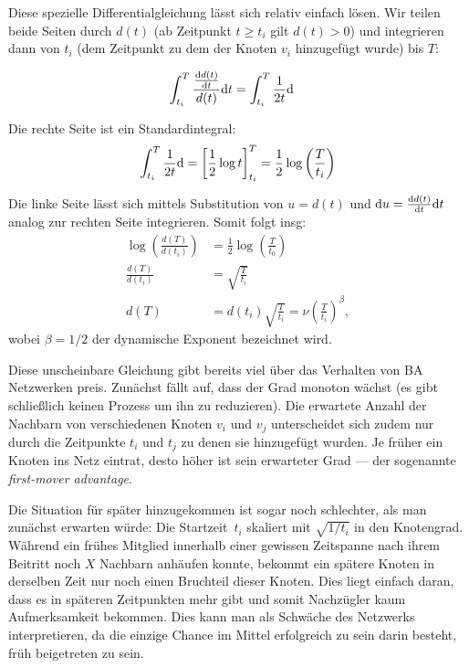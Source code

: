 Diese spezielle Differentialgleichung lässt sich relativ einfach lösen.
Wir teilen beide Seiten durch $d(t)$ (ab Zeitpunkt $t \ge t_i$ gilt $d(t) > 0$) und integrieren dann von $t_i$ (dem Zeitpunkt zu dem der Knoten $v_i$ hinzugefügt wurde) bis $T$:

\begin{align}
    \int_{t_i}^T  \frac{\frac{\text d d(t)}{\text d t}}{d(t)} \text d t & = \int_{t_i}^T \frac{1}{2t} \text d
\end{align}

\noindent
Die rechte Seite ist ein Standardintegral:
\begin{align}
    \int_{t_i}^T \frac{1}{2t} \text d = \left[ \frac 1 2 \log t \right]_{t_i}^T = \frac 1 2 \log\left(\frac{T}{t_i}\right)
\end{align}

Die linke Seite lässt sich mittels Substitution von $u = d(t)$ und $\text d u = \frac{\text d d(t)}{\text d t} \text d t$ analog zur rechten Seite integrieren.
Somit folgt insg:
\begin{align}
    \log\left(\frac{d(T)}{d(t_i)}\right) & = \frac 1 2 \log \left(\frac{T}{t_0}\right)                             \\
    \frac{d(T)}{d(t_i)}                  & = \sqrt{\frac{T}{t_i}}                                                  \\
    d(T)                                 & = d(t_i) \sqrt{\frac{T}{t_i}} = \nu \left( \frac{T}{t_i} \right)^\beta,
\end{align}
wobei $\beta = 1/2$ der  dynamische Exponent bezeichnet wird.

Diese unscheinbare Gleichung gibt bereits viel über das Verhalten von BA Netzwerken preis.
Zunächst fällt auf, dass der Grad monoton wächst (es gibt schließlich keinen Prozess um ihn zu reduzieren).
Die erwartete Anzahl der Nachbarn von verschiedenen Knoten $v_i$ und $v_j$ unterscheidet sich zudem nur durch die Zeitpunkte $t_i$ und $t_j$ zu denen sie hinzugefügt wurden.
Je früher ein Knoten ins Netz eintrat, desto höher ist sein erwarteter Grad --- der sogenannte  \emph{first-mover advantage}.

Die Situation für später hinzugekommen ist sogar noch schlechter, als man zunächst erwarten würde:
Die Startzeit~$t_i$ skaliert mit $\sqrt{1 / t_i}$ in den Knotengrad.
Während ein frühes Mitglied innerhalb einer gewissen Zeitspanne nach ihrem Beitritt noch $X$ Nachbarn anhäufen konnte, bekommt ein spätere Knoten in derselben Zeit nur noch einen Bruchteil dieser Knoten.
Dies liegt einfach daran, dass es in späteren Zeitpunkten mehr  gibt und somit Nachzügler kaum Aufmerksamkeit bekommen.
Dies kann man als Schwäche des Netzwerks interpretieren, da die einzige Chance im Mittel erfolgreich zu sein darin besteht, früh beigetreten zu sein.


